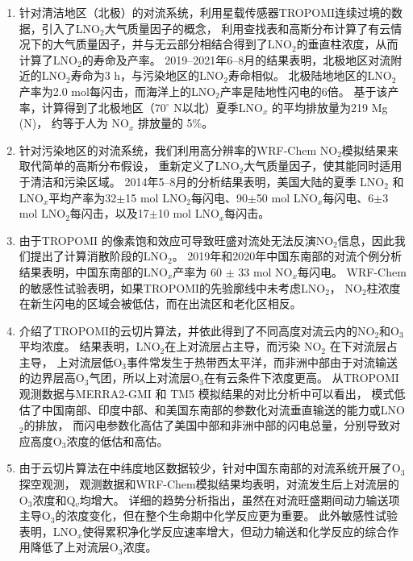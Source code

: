 \begin{enumerate}[label=(\arabic*), labelindent=\parindent, leftmargin=0pt, widest=0, itemindent=*, topsep=0pt, partopsep=0pt, parsep=0pt]

\item 针对清洁地区（北极）的对流系统，利用星载传感器TROPOMI连续过境的数据，引入了LNO$_2$大气质量因子的概念，
利用查找表和高斯分布计算了有云情况下的大气质量因子，并与无云部分相结合得到了LNO$_2$的垂直柱浓度，从而计算了LNO$_2$的寿命及产率。
2019--2021年6--8月的结果表明，北极地区对流附近的LNO$_2$寿命为3 h，与污染地区的LNO$_2$寿命相似。
北极陆地地区的LNO$_2$ 产率为2.0 mol每闪击，而海洋上的LNO$_2$产率是陆地性闪电的6倍。
基于该产率，计算得到了北极地区（70$^{\circ}$ N以北）夏季LNO$_x$ 的平均排放量为219 Mg (N)，
约等于人为 NO$_x$ 排放量的 5\%。

\item 针对污染地区的对流系统，我们利用高分辨率的WRF-Chem NO$_2$模拟结果来取代简单的高斯分布假设，
重新定义了LNO$_2$大气质量因子，使其能同时适用于清洁和污染区域。
2014年5--8月的分析结果表明，美国大陆的夏季 LNO$_2$ 和 LNO$_x$平均产率为32$\pm$15 mol LNO$_2$每闪电、90$\pm$50 mol LNO$_x$每闪电、6$\pm$3 mol LNO$_2$每闪击，以及17$\pm$10 mol LNO$_x$每闪击。

\item 由于TROPOMI 的像素饱和效应可导致旺盛对流处无法反演NO$_2$信息，因此我们提出了计算消散阶段的LNO$_2$。
2019年和2020年中国东南部的对流个例分析结果表明，中国东南部的LNO$_x$产率为 60 $\pm$ 33 mol NO$_x$每闪电。
WRF-Chem的敏感性试验表明，如果TROPOMI的先验廓线中未考虑LNO$_2$，
NO$_2$柱浓度在新生闪电的区域会被低估，而在出流区和老化区相反。

\item 介绍了TROPOMI的云切片算法，并依此得到了不同高度对流云内的NO$_2$和O$_3$平均浓度。
结果表明，LNO$_2$在上对流层占主导，而污染 NO$_2$ 在下对流层占主导，
上对流层低O$_3$事件常发生于热带西太平洋，而非洲中部由于对流输送的边界层高O$_3$气团，所以上对流层O$_3$在有云条件下浓度更高。
从TROPOMI观测数据与MERRA2-GMI 和 TM5 模拟结果的对比分析中可以看出，
模式低估了中国南部、印度中部、和美国东南部的参数化对流垂直输送的能力或LNO$_2$的排放，
而闪电参数化高估了美国中部和非洲中部的闪电总量，分别导致对应高度O$_3$浓度的低估和高估。

\item 由于云切片算法在中纬度地区数据较少，针对中国东南部的对流系统开展了O$_3$探空观测，
观测数据和WRF-Chem模拟结果均表明，对流发生后上对流层的O$_3$浓度和Q$_v$均增大。
详细的趋势分析指出，虽然在对流旺盛期间动力输送项主导O$_3$的浓度变化，但在整个生命期中化学反应更为重要。
此外敏感性试验表明，LNO$_x$使得累积净化学反应速率增大，但动力输送和化学反应的综合作用降低了上对流层O$_3$浓度。

\end{enumerate}

